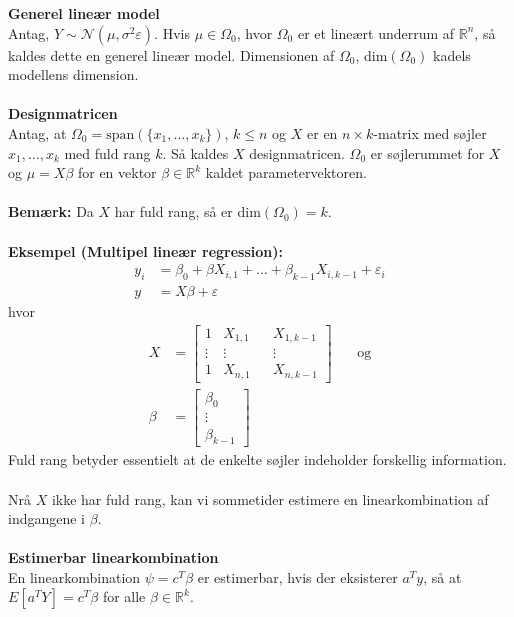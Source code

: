 \documentclass[12pt,a4paper]{report}
\author{Frederik Appel Vardinghus-Nielsen}
\begin{document}
\noindent\textbf{Generel lineær model}\\
Antag, $Y\sim\mathcal{N}(\mu,\sigma^2\varepsilon)$. Hvis $\mu\in\Omega_0$, hvor $\Omega_0$ er et lineært underrum af $\mathbb{R}^n$, så kaldes dette en generel lineær model. Dimensionen af $\Omega_0$, dim$(\Omega_0)$ kadels modellens dimension.\\\\
\textbf{Designmatricen}\\
Antag, at $\Omega_0=\text{span}(\{x_1,\ldots,x_k\})$, $k\leq n$ og $X$ er en $n\times k$-matrix med søjler $x_1,\ldots,x_k$ med fuld rang $k$. Så kaldes $X$ designmatricen. $\Omega_0$ er søjlerummet for $X$ og $\mu=X\beta$ for en vektor $\beta\in\mathbb{R}^k$ kaldet parametervektoren.\\\\
\textbf{Bemærk:} Da $X$ har fuld rang, så er dim$(\Omega_0)=k$.\\\\
\textbf{Eksempel (Multipel lineær regression):}
\begin{align*}
y_i&=\beta_0+\beta X_{i,1}+\ldots+\beta_{k-1}X_{i,k-1}+\varepsilon_i\\
y&=X\beta+\varepsilon
\end{align*}
hvor
\begin{align*}
X&=\begin{bmatrix}1 & X_{1,1}& & X_{1,k-1}\\
\vdots & \vdots & & \vdots\\
1& X_{n,1} & & X_{n,k-1}
\end{bmatrix}\phantom{mm}\text{og}\\
\beta&=\begin{bmatrix}\beta_0\\ \vdots\\ \beta_{k-1}\end{bmatrix}
\end{align*}
Fuld rang betyder essentielt at de enkelte søjler indeholder forskellig information.\\\\
Nrå $X$ ikke har fuld rang, kan vi sommetider estimere en linearkombination af indgangene i $\beta$.\\\\
\textbf{Estimerbar linearkombination}\\
En linearkombination $\psi=c^T\beta$ er estimerbar, hvis der eksisterer $a^Ty$, så at $E[a^TY]=c^T\beta$ for alle $\beta\in\mathbb{R}^k$.\\\\
\end{document}
